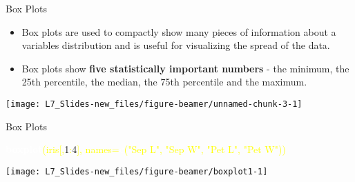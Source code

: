 \documentclass[ignorenonframetext,]{beamer}
\newenvironment{Shaded}{\begin{snugshade}}{\end{snugshade}}
\newcommand{\KeywordTok}[1]{\textcolor{white}{\textbf{{#1}}}}
\newcommand{\NormalTok}[1]{\textcolor{yellow}{{#1}}}
\newcommand{\DataTypeTok}[1]{\textcolor{yellow}{{#1}}}
\newcommand{\DecValTok}[1]{\textcolor{numbercolor}{{#1}}}
\newcommand{\StringTok}[1]{\textcolor{yellow}{{#1}}}
\begin{document}
\begin{frame}[fragile]{Box Plots}

\begin{itemize}
\item
  Box plots are used to compactly show many pieces of information about
  a variables distribution and is useful for visualizing the spread of
  the data.
\item
  Box plots show \textbf{five statistically important numbers} - the
  minimum, the 25th percentile, the median, the 75th percentile and the
  maximum.
\end{itemize}

\small

\begin{Shaded}
\end{Shaded}

\begin{center}\texttt{[image: L7\_Slides-new\_files/figure-beamer/unnamed-chunk-3-1]} \end{center}

\vfill

\end{frame}

\begin{frame}[fragile]{Box Plots}

\small

\begin{Shaded}
\begin{Highlighting}[]
\KeywordTok{boxplot}\NormalTok{(iris[,}\DecValTok{1}\NormalTok{:}\DecValTok{4}\NormalTok{], }
        \DataTypeTok{names=}\KeywordTok{c}\NormalTok{(}\StringTok{"Sep L"}\NormalTok{, }\StringTok{"Sep W"}\NormalTok{, }\StringTok{"Pet L"}\NormalTok{, }\StringTok{"Pet W"}\NormalTok{))}
\end{Highlighting}
\end{Shaded}

\begin{center}\texttt{[image: L7\_Slides-new\_files/figure-beamer/boxplot1-1]} \end{center}

\end{frame}
\end{document}
